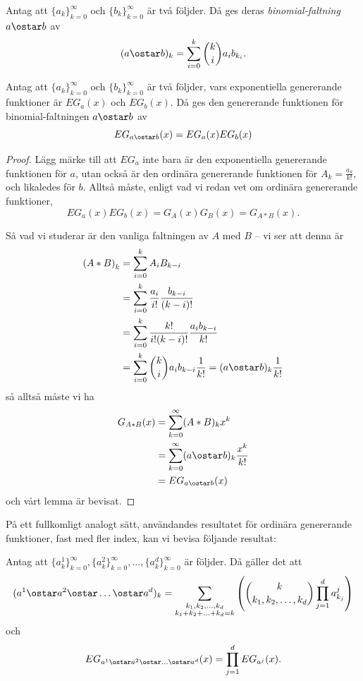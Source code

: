 \documentclass[nobib]{tufte-handout}
\begin{document}
\begin{definition}
  Antag att $\{a_k\}_{k=0}^\infty$ och $\{b_k\}_{k=0}^\infty$ är två följder. Då ges deras \emph{binomial-faltning} $a \ostar b$ av
  $$(a \ostar b)_k = \sum_{i=0}^{k} \binom{k}{i} a_i b_{k_i}.$$
\end{definition}

\begin{lemma}
  Antag att $\{a_k\}_{k=0}^\infty$ och $\{b_k\}_{k=0}^\infty$ är två följder, vars exponentiella genererande funktioner är $EG_a(x)$ och $EG_b(x)$. Då ges den genererande funktionen för binomial-faltningen $a \ostar b$ av
  $$EG_{a \ostar b}(x) = EG_a(x)EG_b(x)$$

  \begin{proof}
    Lägg märke till att $EG_a$ inte bara är den exponentiella genererande funktionen för $a$, utan också är den ordinära genererande funktionen för $A_k = \frac{a_k}{k!}$, och likaledes för $b$. Alltså måste, enligt vad vi redan vet om ordinära genererande funktioner,
    $$EG_a(x)EG_b(x) = G_{A}(x)G_{B}(x) = G_{A * B}(x).$$

    Så vad vi studerar är den vanliga faltningen av $A$ med $B$ -- vi ser att denna är
    \begin{align*}
      \left(A * B\right)_k &= \sum_{i=0}^{k} A_{i}B_{k-i}\\
      &= \sum_{i=0}^{k} \frac{a_i}{i!}\frac{b_{k-i}}{(k-i)!}\\
      &= \sum_{i=0}^{k} \frac{k!}{i!(k-i)!}\frac{a_i b_{k-i}}{k!}\\
      &= \sum_{i=0}^{k} \binom{k}{i}a_i b_{k-i}\frac{1}{k!} = (a \ostar b)_k \frac{1}{k!}
    \end{align*}
    så alltså måste vi ha
    \begin{align*}
      G_{A * B}(x) &= \sum_{k=0}^\infty (A*B)_k x^k\\
      &= \sum_{k=0}^{\infty}(a\ostar b)_k \frac{x^k}{k!}\\
      &= EG_{a \ostar b}(x)
    \end{align*}
    och vårt lemma är bevisat.
  \end{proof}
\end{lemma}

På ett fullkomligt analogt sätt, användandes resultatet för ordinära genererande funktioner, fast med fler index, kan vi bevisa följande resultat:
\begin{lemma}
  Antag att $\{a^1_k\}_{k=0}^\infty, \{a^2_k\}_{k=0}^\infty, \ldots, \{a^d_k\}_{k=0}^\infty$ är följder. Då gäller det att
  $$(a^1 \ostar a^2 \ostar \ldots \ostar a^d)_k = \sum_{\substack{k_1, k_2, \ldots, k_d\\k_1 + k_2 + \ldots + k_d = k}} \left(\binom{k}{k_1, k_2, \ldots, k_d} \prod_{j=1}^{d} a^j_{k_j}\right)$$
  och
  $$EG_{a^1 \ostar a^2 \ostar \ldots \ostar a^d}(x) = \prod_{j=1}^{d} EG_{a^j}(x).$$
\end{lemma}
\end{document}
